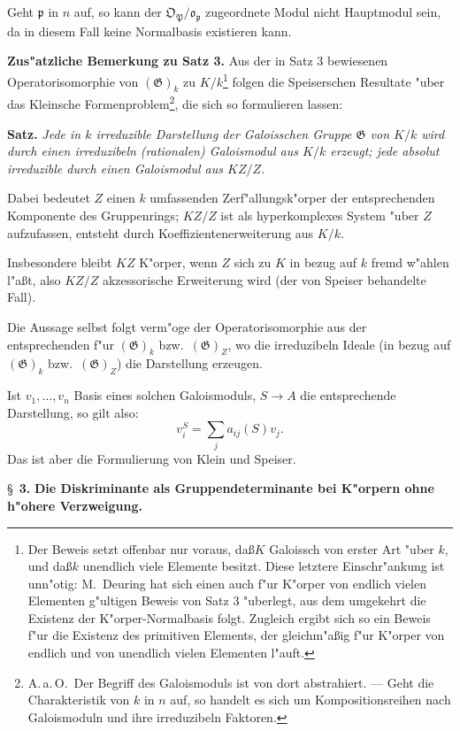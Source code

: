 \documentclass[12pt,a4paper]{article}
\theoremstyle{plain}
\begin{document}
Geht $\mathfrak{p}$ in $n$ auf, so kann der $\mathfrak{O}_\mathfrak{P}/\mathfrak{o}_\mathfrak{p}$ zugeordnete Modul nicht Hauptmodul sein, da in diesem Fall keine Normalbasis existieren kann.

\medskip\noindent\textbf{Zus"atzliche Bemerkung zu Satz 3.}
Aus der in Satz 3 bewiesenen Operatorisomorphie von $(\mathfrak{G})_k$ zu $K/k$\footnote{Der Beweis setzt offenbar nur voraus, da\ss $K$ Galoissch von erster Art "uber $k$, und da\ss $k$ unendlich viele Elemente besitzt. Diese letztere Einschr"ankung ist unn"otig: M.\ Deuring hat sich einen auch f"ur K"orper von endlich vielen Elementen g"ultigen Beweis von Satz 3 "uberlegt, aus dem umgekehrt die Existenz der K"orper-Normalbasis folgt. Zugleich ergibt sich so ein Beweis f"ur die Existenz des primitiven Elements, der gleichm"a\ss ig f"ur K"orper von endlich und von unendlich vielen Elementen l"auft.} folgen die Speiserschen Resultate "uber das Kleinsche Formenproblem\footnote{A.\,a.\,O.\ Der Begriff des Galoismoduls ist von dort abstrahiert. --- Geht die Charakteristik von $k$ in $n$ auf, so handelt es sich um Kompositionsreihen nach Galoismoduln und ihre irreduzibeln Faktoren.}, die sich so formulieren lassen:

\noindent\textbf{Satz.}
\textit{Jede in $k$ irreduzible Darstellung der Galoisschen Gruppe $\mathfrak{G}$ von $K/k$ wird durch einen irreduzibeln (rationalen) Galoismodul aus $K/k$ erzeugt; jede absolut irreduzible durch einen Galoismodul aus $KZ/Z$.}

Dabei bedeutet $Z$ einen $k$ umfassenden Zerf"allungsk"orper der entsprechenden Komponente des Gruppenrings; $KZ/Z$ ist als hyperkomplexes System "uber $Z$ aufzufassen, entsteht durch Koeffizientenerweiterung aus $K/k$.

Insbesondere bleibt $KZ$ K"orper, wenn $Z$ sich zu $K$ in bezug auf $k$ fremd w"ahlen l"a\ss t, also $KZ/Z$ akzessorische Erweiterung wird (der von Speiser behandelte Fall).

Die Aussage selbst folgt verm"oge der Operatorisomorphie aus der entsprechenden f"ur $(\mathfrak{G})_k$ bzw.\ $(\mathfrak{G})_Z$, wo die irreduzibeln Ideale (in bezug auf $(\mathfrak{G})_k$ bzw.\ $(\mathfrak{G})_Z$) die Darstellung erzeugen.

Ist $v_1,\ldots,v_n$ Basis eines solchen Galoismoduls, $S \to A$ die entsprechende Darstellung, so gilt also:
\[
v_i^S = \sum_j a_{ij}(S) v_j.
\]
Das ist aber die Formulierung von Klein und Speiser.

\newpage
\S~\textbf{3.}
\textbf{Die Diskriminante als Gruppendeterminante bei K"orpern ohne h"ohere Verzweigung.}
\end{document}
